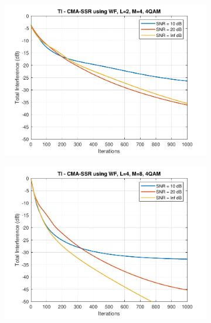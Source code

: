 \begin{figure}
	\centering
	\begin{subfigure}[b]{0.45\textwidth}
		\includegraphics[width=\linewidth]{./figs/BF_WF_TI_4QAM_L=2_M=4_K=1000.pdf}
		\label{fig:wf_ti4_24}
	\end{subfigure}
	\begin{subfigure}[b]{0.45\textwidth}
		\includegraphics[width=\linewidth]{./figs/BF_WF_TI_4QAM_L=4_M=8_K=1000.pdf}
		\label{fig:wf_ti4_48}
	\end{subfigure}\\
	\begin{subfigure}[b]{0.45\textwidth}

\end{subfigure}
\end{figure}
